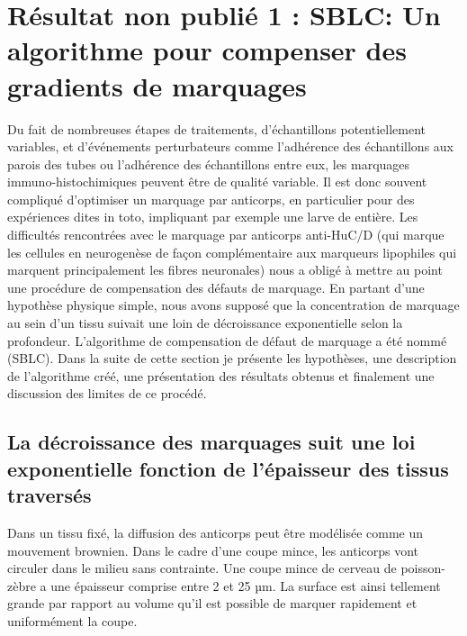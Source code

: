 \documentclass[\main/main.tex]{subfiles}
\begin{document}
\chapter{Résultat non publié 1 :
SBLC: Un algorithme pour compenser des gradients de marquages 
\label{sec:sblc}
}
\chaptermark{\slbc{}}

%
%
Du fait de nombreuses étapes de traitements, d'échantillons potentiellement variables, et d'événements perturbateurs comme l'adhérence des échantillons aux parois des tubes ou l'adhérence des échantillons entre eux, les marquages immuno-histochimiques peuvent être de qualité variable. Il est donc souvent compliqué d'optimiser un marquage par anticorps, en particulier pour des expériences dites in toto, impliquant par exemple une larve de \pz{} entière.
%
Les difficultés rencontrées avec le marquage par anticorps anti-HuC/D (qui marque les cellules en neurogenèse de façon complémentaire aux marqueurs lipophiles qui marquent principalement les fibres neuronales) nous a obligé à mettre au point une procédure de compensation des défauts de marquage.
En partant d'une hypothèse physique simple, nous avons supposé que la concentration de marquage au sein d'un tissu suivait une loin de décroissance exponentielle selon la profondeur.
%
L'algorithme de compensation de défaut de marquage
a été nommé \sblc{} (SBLC).
%
Dans la suite de cette section je présente les hypothèses, une description de l'algorithme créé, une présentation des résultats obtenus et finalement une discussion des limites de ce procédé.

    \section{La décroissance des marquages suit une loi exponentielle fonction de l'épaisseur des tissus traversés}
  
%
Dans un tissu fixé, la diffusion des anticorps peut être modélisée 
comme un mouvement brownien.
%
Dans le cadre d'une coupe mince, les anticorps vont circuler dans le milieu sans contrainte.
%
Une coupe mince de cerveau de poisson-zèbre a une épaisseur comprise entre  2 et 25 µm.
%
La surface est ainsi tellement grande par rapport au volume qu'il est possible de marquer rapidement et uniformément la coupe.
\end{document}
